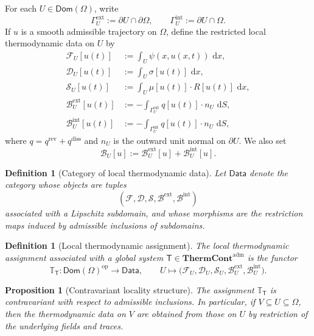 \documentclass[11pt]{article}
\newtheorem{proposition}[theorem]{Proposition}
\newtheorem{definition}[theorem]{Definition}
\newcommand{\Om}{\Omega}
\newcommand{\pa}{\partial}
\newcommand{\dd}{\,\mathrm{d}}
\newcommand{\F}{\mathcal{F}}
\newcommand{\Diss}{\mathcal{D}}
\newcommand{\Bnd}{\mathcal{B}}
\newcommand{\Src}{\mathcal{S}}
\newcommand{\ThermAdm}{\mathbf{ThermCont}^{\mathrm{adm}}}
\begin{document}
For each \(U\in \mathsf{Dom}(\Om)\), write
\[
\Gamma_U^{\mathrm{ext}}:=\pa U\cap \pa\Om,
\qquad
\Gamma_U^{\mathrm{int}}:=\pa U\cap \Om.
\]
If \(u\) is a smooth admissible trajectory on \(\Om\), define the restricted local
thermodynamic data on \(U\) by
\begin{align}
\F_U[u(t)]
&:=
\int_U \psi(x,u(x,t))\,\dd x,\label{eq:F-U}\\
\Diss_U[u(t)]
&:=
\int_U \sigma[u(t)]\,\dd x,\label{eq:D-U}\\
\Src_U[u(t)]
&:=
\int_U \mu[u(t)]\cdot R[u(t)]\,\dd x,\label{eq:S-U}\\
\Bnd_U^{\mathrm{ext}}[u(t)]
&:=
-\int_{\Gamma_U^{\mathrm{ext}}} q[u(t)]\cdot n_U\,\dd S,\label{eq:B-U-ext}\\
\Bnd_U^{\mathrm{int}}[u(t)]
&:=
-\int_{\Gamma_U^{\mathrm{int}}} q[u(t)]\cdot n_U\,\dd S,\label{eq:B-U-int}
\end{align}
where \(q=q^{\mathrm{rev}}+q^{\mathrm{diss}}\) and \(n_U\) is the outward unit normal
on \(\pa U\). We also set
\begin{equation}\label{eq:B-U-total}
\Bnd_U[u]:=\Bnd_U^{\mathrm{ext}}[u]+\Bnd_U^{\mathrm{int}}[u].
\end{equation}

\begin{definition}[Category of local thermodynamic data]
Let \(\mathsf{Data}\) denote the category whose objects are tuples
\[
(\F,\Diss,\Src,\Bnd^{\mathrm{ext}},\Bnd^{\mathrm{int}})
\]
associated with a Lipschitz subdomain, and whose morphisms are the restriction maps
induced by admissible inclusions of subdomains.
\end{definition}

\begin{definition}[Local thermodynamic assignment]
The \emph{local thermodynamic assignment} associated with a global system
\(\mathsf{T}\in\ThermAdm\) is the functor
\[
\mathbb{T}_{\mathsf{T}}:\mathsf{Dom}(\Om)^{\mathrm{op}}\to \mathsf{Data},
\qquad
U\mapsto
\bigl(\F_U,\Diss_U,\Src_U,\Bnd_U^{\mathrm{ext}},\Bnd_U^{\mathrm{int}}\bigr).
\]
\end{definition}

\begin{proposition}[Contravariant locality structure]\label{prop:local-assignment}
The assignment \(\mathbb{T}_{\mathsf{T}}\) is contravariant with respect to
admissible inclusions. In particular, if \(V\subseteq U\subseteq \Om\), then the
thermodynamic data on \(V\) are obtained from those on \(U\) by restriction of the
underlying fields and traces.
\end{proposition}
\end{document}
